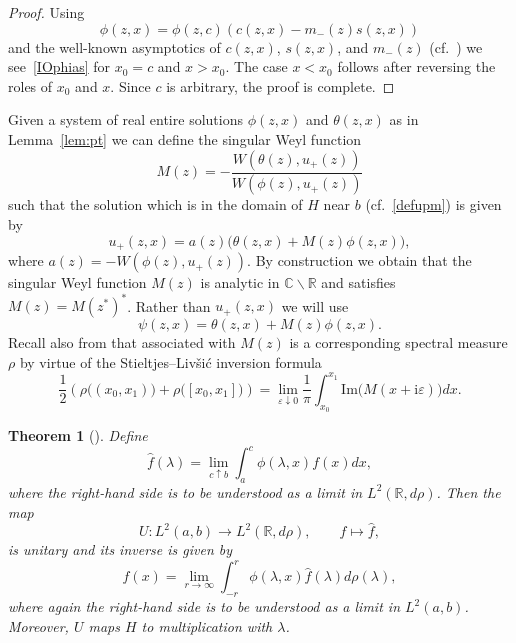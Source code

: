 \documentclass{amsart}
\newtheorem{theorem}{Theorem}[section]
\numberwithin{equation}{section}
\begin{document}
\begin{proof}
Using
\[
\phi(z,x) = \phi(z,c) ( c(z,x) - m_-(z) s(z,x) )
\]
and the well-known asymptotics of $c(z,x)$, $s(z,x)$, and $m_-(z)$ (cf.\ \cite[Lemma~9.18 and Lemma~9.19]{tschroe})
we see~\eqref{IOphias} for $x_0=c$ and $x>x_0$. The case $x<x_0$ follows after reversing the roles of $x_0$ and $x$.
Since $c$ is arbitrary, the proof is complete.
\end{proof}

Given a system of real entire solutions $\phi(z,x)$ and $\theta(z,x)$ as in Lemma~\ref{lem:pt} we can define the
singular Weyl function
\begin{equation}\label{defM}
M(z) = -\frac{W(\theta(z),u_+(z))}{W(\phi(z),u_+(z))}
\end{equation}
such that the solution which is in the domain of $H$ near $b$ (cf.\ \eqref{defupm}) is given by
\begin{equation}
u_+(z,x)= a(z) \big(\theta(z,x) + M(z) \phi(z,x)\big),
\end{equation}
where $a(z)= - W(\phi(z),u_+(z))$.
By construction we obtain that the singular Weyl function $M(z)$ is analytic in ${{\mathbb C}}\backslash{{\mathbb R}}$ and satisfies $M(z)=M(z^*)^*$.
Rather than $u_+(z,x)$ we will use
\begin{equation}\label{defpsi}
\psi(z,x)= \theta(z,x) + M(z) \phi(z,x).
\end{equation} 
Recall also from \cite[Lemma~3.2]{kst2} that associated with $M(z)$ is a corresponding spectral measure $\rho$ by virtue of
the Stieltjes--Liv\v{s}i\'{c} inversion formula
\begin{equation}\label{defrho}
\frac{1}{2} \left( \rho\big((x_0,x_1)\big) + \rho\big([x_0,x_1]\big) \right)=
\lim_{{\varepsilon}\downarrow 0} \frac{1}{\pi} \int_{x_0}^{x_1} {\mathrm{Im}}\big(M(x+{\mathrm{i}}{\varepsilon})\big) dx.
\end{equation}

\begin{theorem}[\cite{gz}]
Define
\begin{equation}
\hat{f}({\lambda}) = \lim_{c\uparrow b} \int_a^c \phi({\lambda},x) f(x) dx,
\end{equation}
where the right-hand side is to be understood as a limit in $L^2({{\mathbb R}},d\rho)$. Then the map
\begin{equation}
U: L^2(a,b) \to L^2({{\mathbb R}},d\rho), \qquad f \mapsto \hat{f},
\end{equation}
is unitary and its inverse is given by
\begin{equation}\label{Uinv}
f(x) = \lim_{r\to\infty} \int_{-r}^r \phi({\lambda},x) \hat{f}({\lambda}) d\rho({\lambda}),
\end{equation}
where again the right-hand side is to be understood as a limit in $L^2(a,b)$.
Moreover, $U$ maps $H$ to multiplication with ${\lambda}$.
\end{theorem}
\end{document}
